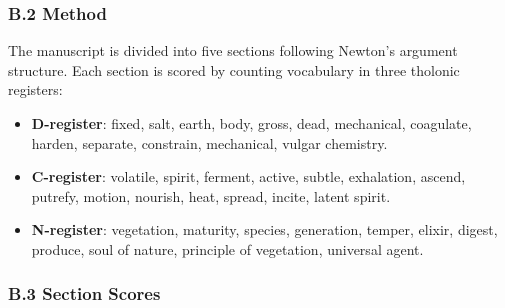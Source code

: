 \documentclass[
  11pt,
  letterpaper,
]{article}
\providecommand{\tightlist}{%
  \setlength{\itemsep}{0pt}\setlength{\parskip}{0pt}}
\begin{document}
\subsubsection{B.2 Method}\label{b.2-method}

The manuscript is divided into five sections following Newton's argument
structure. Each section is scored by counting vocabulary in three
tholonic registers:

\begin{itemize}
\tightlist
\item
  \textbf{D-register}: fixed, salt, earth, body, gross, dead,
  mechanical, coagulate, harden, separate, constrain, mechanical, vulgar
  chemistry.
\item
  \textbf{C-register}: volatile, spirit, ferment, active, subtle,
  exhalation, ascend, putrefy, motion, nourish, heat, spread, incite,
  latent spirit.
\item
  \textbf{N-register}: vegetation, maturity, species, generation,
  temper, elixir, digest, produce, soul of nature, principle of
  vegetation, universal agent.
\end{itemize}

\subsubsection{B.3 Section Scores}\label{b.3-section-scores}
\end{document}
